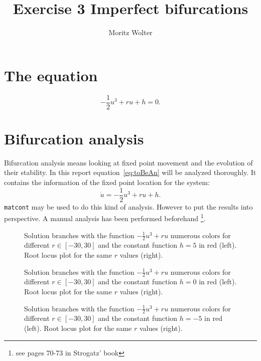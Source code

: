 




\title{Exercise 3 Imperfect bifurcations}
\author{Moritz Wolter}

\maketitle

\section{The equation}
\begin{equation}
-\frac{1}{2} u^3 + ru + h = 0. 
\label{eq:toBeAn}
\end{equation}

\section{Bifurcation analysis}
Bifurcation analysis means looking at fixed point movement and the evolution of their stability. In this report equation~\ref{eq:toBeAn} will be analyzed thoroughly. It contains the information of the fixed point location for the system:
\begin{equation}
\dot{u} = -\frac{1}{2} u^3 + ru + h.   
\end{equation}
\texttt{matcont} may be used to do this kind of analysis. However to put the results into perspective. A manual analysis has been performed beforehand \footnote{see pages 70-73 in Strogatz' book}. 

\begin{figure}
\centering


\caption{Solution branches with the function $-\frac{1}{2} u^3 + ru $ numerous colors for different $r\in [-30,30]$ and the constant function $h=5$ in red (left). Root locus plot for the same $r$ values (right).}
\label{fig:one}


\caption{Solution branches with the function $-\frac{1}{2} u^3 + ru $ numerous colors for different $r\in [-30,30]$ and the constant function $h=0$ in red (left). Root locus plot for the same $r$ values (right).}


\caption{Solution branches with the function $-\frac{1}{2} u^3 + ru $ numerous colors for different $r\in [-30,30]$ and the constant function $h=-5$ in red (left). Root locus plot for the same $r$ values (right).}
\end{figure}



